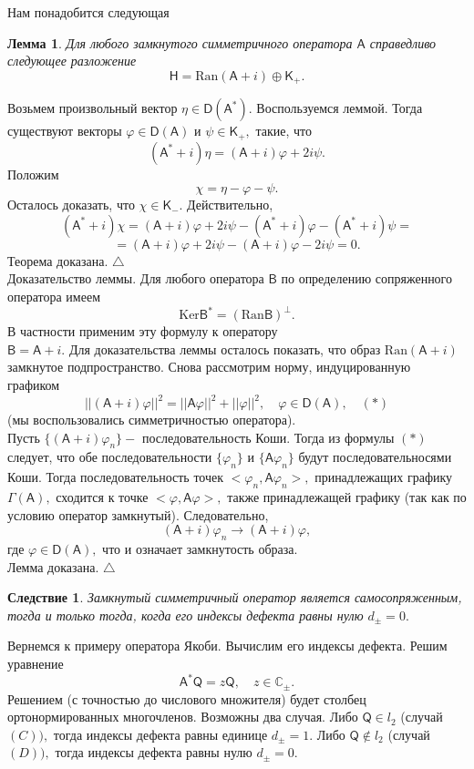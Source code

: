 \documentclass[12 pt, a4 paper]{article}
\theoremstyle{plain}   \newtheorem{Pro}{Задача}
\newtheorem{Cor}{Следствие}
\newtheorem{Lem}{Лемма}
\begin{document}
Нам понадобится следующая
\begin{Lem}
Для любого замкнутого симметричного оператора
$ \mathsf{A} $
справедливо следующее разложение
$$
  \mathsf{H}=\mathrm{Ran}(\mathsf{A}+i)
  \oplus \mathsf{K}_+ .
$$
\end{Lem}
Возьмем произвольный вектор
$ \eta \in \mathsf{D}(\mathsf{A}^{\ast}). $
Воспользуемся леммой. Тогда существуют векторы
$ \varphi \in \mathsf{D}(\mathsf{A}) $
и
$ \psi \in \mathsf{K}_+ , $
такие, что
$$
  (\mathsf{A}^{\ast}+i)\eta =(\mathsf{A}+i)\varphi +2i\psi .
$$
Положим
$$
  \chi =\eta -\varphi -\psi .
$$
Осталось доказать, что
$ \chi \in \mathsf{K}_- . $
Действительно,
$$
 (\mathsf{A}^{\ast}+i)\chi = (\mathsf{A}+i)\varphi +
 2i\psi - (\mathsf{A}^{\ast}+i)\varphi -
 (\mathsf{A}^{\ast}+i)\psi=
$$
$$
 =(\mathsf{A}+i)\varphi +2i\psi -
 (\mathsf{A}+i)\varphi -2i\psi =0.
$$
Теорема доказана.
$ \triangle $
\\
{\Large Доказательство леммы.}
Для любого оператора
$ \mathsf{B} $
по определению сопряженного оператора имеем
$$
  \mathrm{Ker}\mathsf{B}^{\ast}=
  (\mathrm{Ran} \mathsf{B})^{\bot}.
$$
В частности применим эту формулу к оператору\\
$ \mathsf{B}=\mathsf{A}+i . $
Для доказательства леммы осталось показать, что образ
$ \mathrm{Ran}(\mathsf{A}+i) $
замкнутое подпространство.
Снова рассмотрим норму, индуцированную графиком
$$
  ||(\mathsf{A}+i)\varphi ||^2 =
  ||\mathsf{A} \varphi ||^2 +||\varphi ||^2 ,
  \quad \varphi \in \mathsf{D}(\mathsf{A}) ,
  \quad (\ast )
$$
(мы воспользовались симметричностью оператора).
\\
Пусть
$ \{ (\mathsf{A}+i)\varphi _n \} - $
последовательность Коши. Тогда из формулы
$ (\ast ) $
следует, что обе последовательности
$ \{ \varphi _n \} $
и
$ \{ \mathsf{A}\varphi _n \} $
будут последовательносями Коши. Тогда последовательность точек
$ <\varphi _n , \mathsf{A}\varphi _n > , $
принадлежащих графику
$ \Gamma (\mathsf{A}) , $
сходится к точке
$ <\varphi , \mathsf{A}\varphi > , $
также принадлежащей графику (так как по условию оператор
замкнутый). Следовательно,
$$
  (\mathsf{A}+i)\varphi_n \longrightarrow
  (\mathsf{A}+i)\varphi ,
$$
где
$ \varphi \in \mathsf{D}(\mathsf{A}) , $
что и означает замкнутость образа.\\
Лемма доказана.
$ \triangle $
\begin{Cor}
Замкнутый симметричный оператор является самосопряженным,
тогда и только тогда, когда его индексы дефекта
равны нулю
$ d_{\pm}=0. $
\end{Cor}
Вернемся к примеру оператора Якоби. Вычислим его индексы дефекта.
Решим уравнение
$$
  \mathsf{A}^{\ast}\mathsf{Q}=z\mathsf{Q},
  \quad z \in \mathbb{C}_{\pm} .
$$
Решением (с точностью до числового множителя) будет
столбец ортонормированных многочленов. Возможны два случая.
Либо
$ \mathsf{Q} \in l_2 $
(случай
$ (C)), $
тогда индексы дефекта равны единице
$ d_{\pm}=1. $
Либо
$ \mathsf{Q} \not \in l_2 $
(случай
$ (D)), $
тогда индексы дефекта равны нулю
$ d_{\pm}=0 . $
\\
\end{document}

